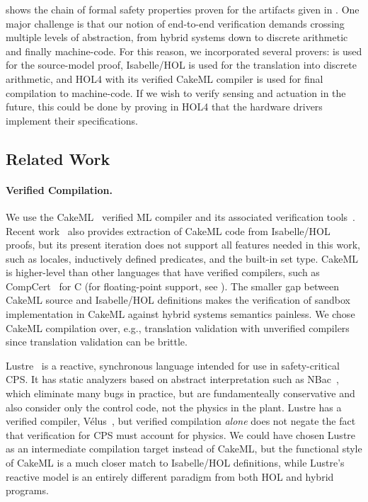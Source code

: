 \documentclass[12pt]{cmuthesis}
\theoremstyle{definition}
\theoremstyle{remark}
\newcommand{\rref}[2][]{\prettyref{#2}}
\newcommand{\Isabelle}{Isabelle/HOL\xspace}
\begin{document}
\rref{fig:proofchainoverview} shows the chain of formal safety properties proven for the artifacts given in \rref{fig:pipelineoverview}.
One major challenge is that our notion of end-to-end verification demands crossing multiple levels of abstraction, from hybrid systems down to discrete arithmetic and finally machine-code.
For this reason, we incorporated several provers: \KeYmaeraX is used for the source-model proof, Isabelle/HOL is used for the translation into discrete arithmetic, and HOL4 with its verified CakeML compiler is used for final compilation to machine-code.
If we wish to verify sensing and actuation in the future, this could be done by proving in HOL4 that the hardware drivers implement their specifications.

\subsection{Related Work}
\paragraph{Verified Compilation.}
We use the CakeML~\cite{DBLP:conf/icfp/TanMKFON16} verified ML compiler and its associated verification tools~\cite{DBLP:conf/icfp/MyreenO12,DBLP:conf/esop/GueneauMKN17}.
Recent work~\cite{DBLP:conf/esop/HupelN18} also provides extraction of CakeML code from \Isabelle proofs, but its present iteration does not support all features needed in this work, such as locales, inductively defined predicates, and the built-in set type.
CakeML is higher-level than other languages that have verified compilers, such as CompCert~\cite{Leroy:popl:2006}  for C (for floating-point support, see \cite{DBLP:conf/arith/BoldoJLM13}).
The smaller gap between CakeML source and Isabelle/HOL definitions makes the verification of sandbox implementation in CakeML against hybrid systems semantics painless.
We chose CakeML compilation over, e.g., translation validation with unverified compilers~\cite{DBLP:conf/pldi/SewellMK13} since translation validation can be brittle.

Lustre~\cite{DBLP:journals/tse/HalbwachsLR92} is a reactive, synchronous language intended for use in safety-critical CPS.
It has static analyzers based on abstract interpretation such as NBac~\cite{DBLP:journals/fmsd/Jeannet03}, which eliminate many bugs in practice, but are fundamenteally conservative and also consider only the control code, not the physics in the plant.
Lustre has a verified compiler, V\'{e}lus~\cite{DBLP:conf/pldi/BourkeBDLPR17}, but verified compilation \emph{alone} does not negate the fact that verification for CPS must account for physics.
We could have chosen Lustre as an intermediate compilation target instead of CakeML, but the functional style of CakeML is a much closer match to Isabelle/HOL definitions, while Lustre's reactive model is an entirely different paradigm from both HOL and hybrid programs.
\end{document}

